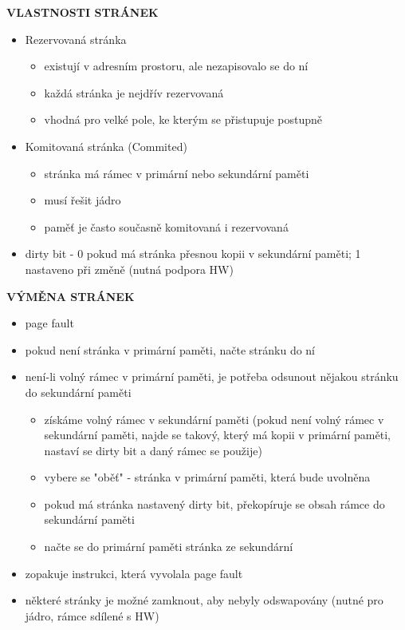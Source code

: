 \documentclass[10pt,a4paper]{article}
\begin{document}
\textbf{VLASTNOSTI STRÁNEK}
\begin{itemize}
	\item Rezervovaná stránka
	\begin{itemize}
		\item existují v adresním prostoru, ale nezapisovalo se do ní
		\item každá stránka je nejdřív rezervovaná
		\item vhodná pro velké pole, ke kterým se přistupuje postupně
	\end{itemize}
	\item Komitovaná stránka (Commited)
	\begin{itemize}
		\item stránka má rámec v primární nebo sekundární paměti
		\item musí řešit jádro
		\item paměť je často současně komitovaná i rezervovaná
	\end{itemize}
	\item dirty bit - 0 pokud má stránka přesnou kopii v sekundární paměti; 1 nastaveno při změně
(nutná podpora HW)
\end{itemize}

\textbf{VÝMĚNA STRÁNEK}
\begin{itemize}
	\item page fault
	\item pokud není stránka v primární paměti, načte stránku do ní
	\item není-li volný rámec v primární paměti, je potřeba odsunout nějakou stránku do sekundární
paměti
	\begin{itemize}
		\item získáme volný rámec v sekundární paměti (pokud není volný rámec v sekundární paměti,
najde se takový, který má kopii v primární paměti, nastaví se dirty bit a daný rámec
se použije)
		\item vybere se "oběť" - stránka v primární paměti, která bude uvolněna
		\item pokud má stránka nastavený dirty bit, překopíruje se obsah rámce do sekundární paměti
		\item načte se do primární paměti stránka ze sekundární
	\end{itemize}
	\item zopakuje instrukci, která vyvolala page fault
	\item některé stránky je možné zamknout, aby nebyly odswapovány (nutné pro jádro, rámce sdílené
s HW)
\end{itemize}
\end{document}
